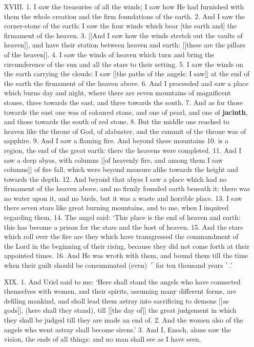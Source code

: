XVIII. 1. I saw the treasuries of all the winds; I
saw how He had furnished with them the whole
creation and the firm foundations of the earth.
2. And I saw the corner-stone of the earth: I saw
the four winds which bear [the earth and] the firmament
of the heaven. 3. [[And I saw how the winds
stretch out the vaults of heaven]], and have their
station between heaven and earth: [[these are the
pillars of the heaven]]. 4. I saw the winds of heaven
which turn and bring the circumference of the sun
and all the stars to their setting. 5. I saw the winds
on the earth carrying the clouds: I saw [[the paths of
the angels: I saw]] at the end of the earth the firmament
of the heaven above. 6. And I proceeded and
saw a place which burns day and night, where there
are seven mountains of magnificent stones, three
towards the east, and three towards the south.
7. And as for those towards the east one was of
coloured stone, and one of pearl, and one of \textbf{jacinth},
and those towards the south of red stone. 8. But
the middle one reached to heaven like the throne of
God, of alabaster, and the summit of the throne was
of sapphire. 9. And I saw a flaming fire. And
beyond these mountains 10. is a region, the end of
the great earth: there the heavens were completed.
11. And I saw a deep abyss, with columns [[of heavenly
fire, and among them I saw columns]] of fire fall, which
were beyond measure alike towards the height and
towards the depth. 12. And beyond that abyss I
saw a place which had no firmament of the heaven
above, and no firmly founded earth beneath it: there
was no water upon it, and no birds, but it was a waste
and horrible place. 13. I saw there seven stars like
great burning mountains, and to me, when I inquired
regarding them, 14. The angel said: ‘This place
is the end of heaven and earth: this has become a
prison for the stars and the host of heaven. 15. And
the stars which roll over the fire are they which have
transgressed the commandment of the Lord in the
beginning of their rising, because they did not come
forth at their appointed times. 16. And He was
wroth with them, and bound them till the time when
their guilt should be consummated (even) $\ulcorner$for ten
thousand years$\urcorner$.’

XIX. 1. And Uriel said to me: ‘Here shall stand
the angels who have connected themselves with
women, and their spirits, assuming many different
forms, are defiling mankind, and shall lead them astray
into sacrificing to demons [[as gods]], (here shall they
stand), till [[the day of]] the great judgement in which
they shall be judged till they are made an end of.
2. And the women also of the angels who went astray
shall become sirens.’ 3. And I, Enoch, alone saw
the vision, the ends of all things: and no man shall
see as I have seen.

